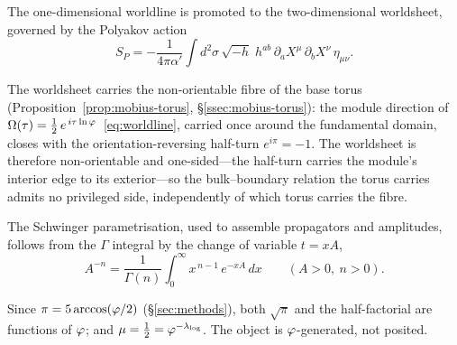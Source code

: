 The one-dimensional worldline is promoted to the two-dimensional worldsheet, governed by the
Polyakov action~\cite{Polchinski98}
\begin{equation}\label{eq:polyakov}
  S_{P}=-\frac{1}{4\pi\alpha'}\int d^{2}\sigma\,\sqrt{-h}\;
        h^{ab}\,\partial_{a}X^{\mu}\,\partial_{b}X^{\nu}\,\eta_{\mu\nu}.
\end{equation}

\begin{proposition}\label{prop:mobius}
The worldsheet carries the non-orientable fibre of the base torus
(Proposition~\ref{prop:mobius-torus}, \S\ref{ssec:mobius-torus}): the module direction of
$\Omega(\tau)=\tfrac12\,e^{\,i\tau\ln\varphi}$~\eqref{eq:worldline}, carried once around the fundamental
domain, closes with the orientation-reversing half-turn $e^{i\pi}=-1$. The worldsheet is therefore
non-orientable and one-sided---the half-turn carries the module's interior edge to its exterior---so
the bulk--boundary relation the torus carries admits no privileged side, independently of which torus
carries the fibre.

\end{proposition}

The Schwinger parametrisation, used to assemble propagators and amplitudes, follows from the
$\Gamma$ integral by the change of variable $t=xA$,
\begin{equation}\label{eq:schwinger}
  A^{-n}=\frac{1}{\Gamma(n)}\int_{0}^{\infty}x^{\,n-1}\,e^{-xA}\,dx\qquad(A>0,\ n>0).
\end{equation}

\begin{remark}
Since $\pi=5\arccos(\varphi/2)$ (\S\ref{sec:methods}), both $\sqrt\pi$ and the half-factorial
are functions of $\varphi$; and $\mu=\tfrac12=\varphi^{-\lambda_{\log}}$. The object is $\varphi$-generated,
not posited.
\end{remark}


